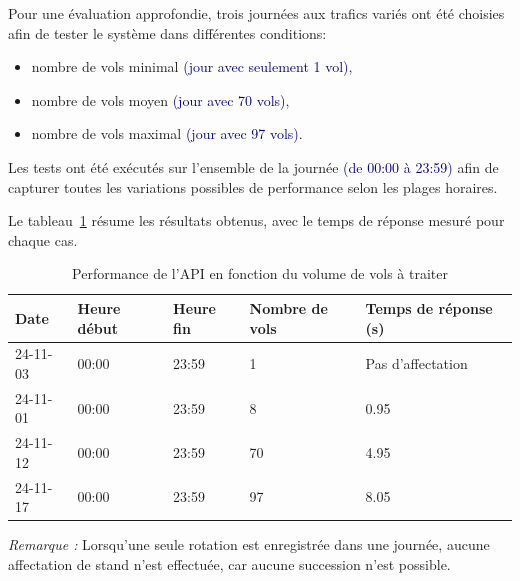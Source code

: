 Pour une évaluation approfondie, trois journées aux trafics variés ont été choisies afin de tester le système dans différentes conditions:
\begin{itemize}
	\item nombre de vols minimal \textcolor{darkblue}{(jour avec seulement 1 vol)},
	\item nombre de vols moyen \textcolor{darkblue}{(jour avec 70 vols)},
	\item nombre de vols maximal \textcolor{darkblue}{(jour avec 97 vols)}.
\end{itemize}

Les tests ont été exécutés sur l'ensemble de la journée \textcolor{darkblue}{(de 00:00 à 23:59)} afin de capturer toutes les variations possibles de performance selon les plages horaires.

Le tableau~\ref{tab:tests-performance} résume les résultats obtenus, avec le temps de réponse mesuré pour chaque cas.

\begin{table}[H]
	\centering
	\renewcommand{\arraystretch}{0.9}
	\caption{Performance de l’API en fonction du volume de vols à traiter}
	\begin{tabularx}{\textwidth}{l l l X X}
		\toprule
		\textbf{Date} & \textbf{Heure début} & \textbf{Heure fin} & \textbf{Nombre de vols} & \textbf{Temps de réponse (s)} \\
		\midrule
		24-11-03 & 00:00 & 23:59 & 1 & Pas d'affectation \\
		24-11-01 & 00:00 & 23:59 & 8 & 0.95 \\
		24-11-12 & 00:00 & 23:59 & 70 & 4.95 \\
		24-11-17 & 00:00 & 23:59 & 97 & 8.05 \\
		\bottomrule
	\end{tabularx}
	\label{tab:tests-performance}
\end{table}

\noindent
\textit{Remarque :} Lorsqu'une seule rotation est enregistrée dans une journée, aucune affectation de stand n’est effectuée, car aucune succession n’est possible.

